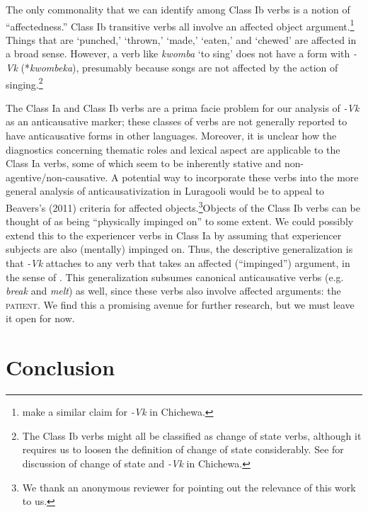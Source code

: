 \documentclass[output=paper]{langsci/langscibook}
\begin{document}
The only commonality that we can identify among Class Ib verbs is a notion of “affectedness.” Class Ib transitive verbs all involve an affected object argument.\footnote{\citet{Dubinsky1996} make a similar claim for \textit{-Vk} in Chichewa.} Things that are ‘punched,’ ‘thrown,’ ‘made,’ ‘eaten,’ and ‘chewed’ are affected in a broad sense. However, a verb like \textit{kwomba} ‘to sing’ does not have a form with \textit{-Vk} (*\textit{kwombeka}), presumably because songs are not affected by the action of singing.\footnote{The Class Ib verbs might all be classified as change of state verbs, although it requires us to loosen the definition of change of state considerably. See \citet{Dubinsky1996} for discussion of change of state and \textit{-Vk} in Chichewa.}

The Class Ia and Class Ib verbs are a prima facie problem for our analysis of \textit{-Vk} as an anticausative marker; these classes of verbs are not generally reported to have anticausative forms in other languages. Moreover, it is unclear how the diagnostics concerning thematic roles and lexical aspect are applicable to the Class Ia verbs, some of which seem to be inherently stative and non-agentive/non-causative. A potential way to incorporate these verbs into the more general analysis of anticausativization in Luragooli would be to appeal to Beavers’s (2011) criteria for affected objects.\footnote{We thank an anonymous reviewer for pointing out the relevance of this work to us.}Objects of the Class Ib verbs can be thought of as being “physically impinged on” to some extent. We could possibly extend this to the experiencer verbs in Class Ia by assuming that experiencer subjects are also (mentally) impinged on. Thus, the descriptive generalization is that  \textit{-Vk} attaches to any verb that takes an affected (“impinged”) argument, in the sense of \citet{Beavers2011}. This generalization subsumes canonical anticausative verbs (e.g. \textit{break} and \textit{melt}) as well, since these verbs also involve affected arguments: the \textsc{patient}. We find this a promising avenue for further research, but we must leave it open for now.

\section{Conclusion}\label{sec:gluckman:6}
\end{document}
